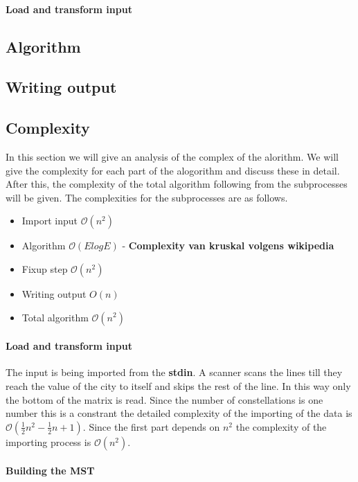 \documentclass{article}
\newcommand{\bigO}[1]{\mathcal{O}(#1)}
\begin{document}
\paragraph{Load and transform input}
\subsection{Algorithm}
\subsection{Writing output}

\subsection{Complexity}
In this section we will give an analysis of the complex of the alorithm. We will give the complexity for each part of the alogorithm and discuss these in detail. After this, the complexity of the total algorithm following from the subprocesses will be given. The complexities for the subprocesses are as follows.
\begin{itemize}
  \item Import input $\bigO{n^2}$
  \item Algorithm $\bigO{E log E}$ - \textbf{Complexity van kruskal volgens wikipedia}
  \item Fixup step $\bigO{n^2}$
  \item Writing output $O(n)$
  \item Total algorithm $\bigO{n^2}$
\end{itemize}

\paragraph{Load and transform input}
The input is being imported from the \textbf{stdin}. A scanner scans the lines till they reach the value of the city to itself and skips the rest of the line. In this way only the bottom of the matrix is read. Since the number of constellations is one number this is a constrant the detailed complexity of the importing of the data is $\bigO{\frac{1}{2}n^2 - \frac{1}{2}n + 1}$. Since the first part depends on $n^2$ the complexity of the importing process is $\bigO{n^2}$.

\paragraph{Building the MST}
\end{document}
